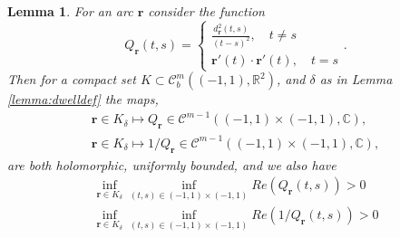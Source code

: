\documentclass{article}
\newtheorem{lemma}[theorem]{Lemma}
\newcommand{\IC}{{\mathbb C}}
\newcommand{\IR}{{\mathbb R}}
\newcommand{\cmspace}[3]{\mathcal{C}^{#1} \left( #2, #3 \right)}
\newcommand{\rgeo}[1]{\mathcal{C}_b^{#1}\left( (-1,1), \IR^2 \right)}
\newcommand{\br}{\bm{r}}
\begin{document}
\begin{lemma}
\label{lemma:Qfun}
For an arc $\br$ consider the function 
$$
Q_{\br}(t,s) = \begin{cases}
\frac{d^2_{\br}(t,s)}{(t-s)^2}, \quad t\neq s \\
\br '(t) \cdot \br '(t), \quad t =s 
\end{cases}.
$$
Then for a compact set $K \subset \rgeo{m}$, and $\delta$ as in Lemma \ref{lemma:dwelldef} the maps, 
\begin{align*}
\br \in K_\delta \mapsto Q_{\br} \in \cmspace{m-1}{(-1,1)\times(-1,1)}{\IC}, \\
\br \in K_\delta \mapsto 1/Q_{\br} \in \cmspace{m-1}{(-1,1)\times(-1,1)}{\IC}, 
\end{align*} 
are both holomorphic, uniformly bounded, and we also have  
\begin{align*}
\inf_{\br \in K_\delta} \inf_{(t,s) \in (-1,1)\times (-1,1)} Re(Q_{\br}(t,s)) >0 \\
\inf_{\br \in K_\delta} \inf_{(t,s) \in (-1,1)\times (-1,1)} Re(1/Q_{\br}(t,s)) >0 
\end{align*}
\end{lemma}
\end{document}
